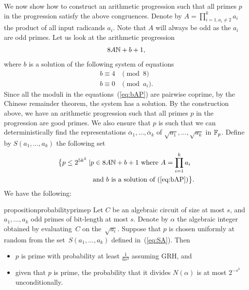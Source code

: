 We now show how to construct an arithmetic progression such that all primes $p$ in the progression satisfy the above congruences. Denote by $A=\prod_{i=1,a_i\neq 2}^{k}a_i$ the product of all input radicands $a_i$. Note that $A$ will always be odd as the $a_i$ are odd primes. Let us look at the arithmetic progression
\begin{equation}\label{eq:arithmetic_progression_corp}
	 8A\mathbb{N} + b + 1,
\end{equation}
where $b$ is a solution of the following system of equations 
\begin{align}\label{eq:bAP}
	b \equiv 4 &\pmod{8} \\
	b \equiv 0 &\pmod{a_i}. \nonumber
\end{align}
Since all the moduli in the equations~(\ref{eq:bAP}) are pairwise coprime, by the Chinese remainder theorem, the  system has a solution.
By the construction above,
 we have an arithmetic progression such that all primes $p$ in the progression are  good primes.
We also ensure that $p$ is such that we can deterministically find the representations $\overline{\alpha}_1,\ldots,\overline{\alpha}_k$ of $\sqrt{a_1},\ldots,\sqrt{a_k}$ in $\mathbb{F}_p$.
Define by $S(a_1,\ldots,a_k)$ the following set  
\begin{align}\label{eq:SA}\big\{p \leq 2^{5k^3} \mid  &p \in  8A \mathbb{N}+ b+1  \text{ where } A=\prod_{i=1}^{k}a_i \\
    &\text{ and } b \text{ is a solution of~(\ref{eq:bAP})} \big\}. 	\nonumber
\end{align}
We have the following:

\begin{restatable}{proposition}{probabilityprimep}\label{prop:density_corp}
Let $C$ be an algebraic circuit of size at most $s$, and $a_1, \ldots, a_k$ odd primes of bit-length at most $s$. 
	 Denote by $\alpha$ the algebraic integer obtained by evaluating~$C$ on the~$\sqrt{a_i}$. Suppose that $p$ is chosen uniformly at random from the set~$S(a_1,\ldots,a_k)$ defined in~(\ref{eq:SA}).
	 Then
		\begin{itemize}
			\item[(i)] $p$ is prime with probability at least
			$\frac{1}{6s^3}$ assuming GRH, 
			 and
			\item[(ii)] given that $p$ is prime, the probability that it divides $N(\alpha)$ is at most $2^{-s^3}$	unconditionally.
		\end{itemize}
\end{restatable}



